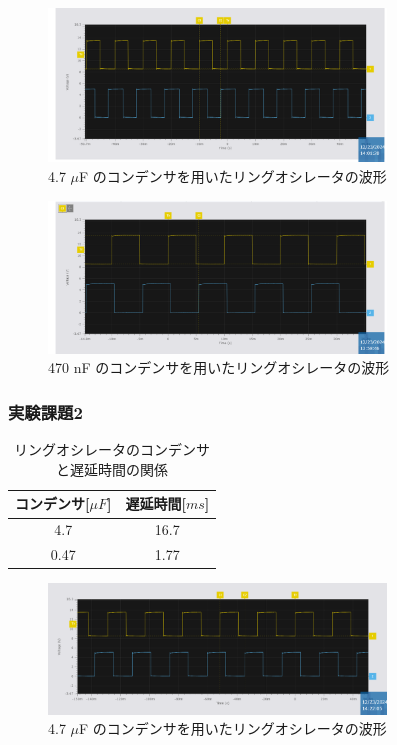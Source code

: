 \documentclass{ltjsarticle}
\begin{document}
\begin{figure}[H]
\centering
\includegraphics[width=0.8\textwidth]{figs/1-4700nF.png}
\caption{4.7 $\mu$F のコンデンサを用いたリングオシレータの波形}
\label{fig:1_4.7_experiment_results}
\end{figure}

\begin{figure}[H]
  \centering
  \includegraphics[width=0.8\textwidth]{figs/1-470mF.png}
  \caption{470 nF のコンデンサを用いたリングオシレータの波形}
  \label{fig:1_470_experiment_results}
  \end{figure}

\subsubsection{実験課題2}
\begin{table}[H]
  \centering
  \begin{tabular}{|c|c|}
  \hline
  コンデンサ[${\mu F}$] & 遅延時間[${ms}$] \\ \hline
  4.7 & 16.7  \\ \hline
  0.47 & 1.77 \\ \hline
  \end{tabular}
  \caption{リングオシレータのコンデンサと遅延時間の関係}
  \label{tab:results_2}
\end{table}

\begin{figure}[H]
  \centering
  \includegraphics[width=0.8\textwidth]{figs/2-4700nF.png}
  \caption{4.7 $\mu$F のコンデンサを用いたリングオシレータの波形}
  \label{fig:2_4.7_experiment_results}
\end{figure}
\end{document}
